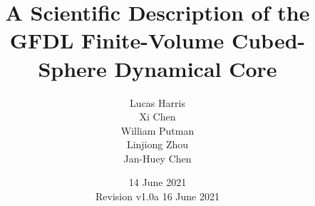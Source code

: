 \documentclass[10pt,letterpaper,margin=1in]{memoir}
\title{A Scientific Description of the GFDL Finite-Volume Cubed-Sphere Dynamical Core}
\author{Lucas Harris\\Xi Chen\\William Putman\\Linjiong Zhou\\Jan-Huey Chen}
\date{14 June 2021\\Revision v1.0a 16 June 2021}
\makeatletter
\newcommand\email[1]{\_email #1\q_nil}
\def\_email#1@#2\q_nil{%
\makeatother
\begin{document}
\maketitle
\thispagestyle{empty}

\eject
\tableofcontents

\chapter*{Disclaimer}

\addcontentsline{toc}{chapter}{Disclaimer}

We have made every effort to ensure that the information in this document is as accurate, complete, and as up-to-date as possible. However, due to the rapid pace of FV3 development the document may not always reflect the current state of FV3 capabilities. Often, the code itself is the best description of the current capabilities and the available options, which due to limited space cannot all be described in full detail here. Contact GFDL FV3 support at \email{oar.gfdl.fv3_dycore_support@noaa.gov} for assistance and more information. 

The most up-to-date documentation, articles, and tutorials can always be found at the GFDL Documentation and References site at \href{https://www.gfdl.noaa.gov/fv3/fv3-documentation-and-references/}{www.gfdl.noaa.gov/fv3/fv3-documentation-and-references/}.

This document is licensed under the Creative Commons Attribution 4.0 International license, which allows reuse and distribution for any purpose but requires that the authors be credited.

  \begin{center}
   \texttt{[image: \{fv3logo.png]}}
  \end{center}

\chapter*{Dedication and Acknowledgements}


Virtually all of the algorithms described in this document are the work of Shian-Jiann Lin, of late retired from NOAA. This document is the interpretation of the FV3 algorithms and design by the authors, although it is heavily influenced by S-J's thinking and he provided reviews of a very early draft. We could say of this document that it contains ``not one word of Lin and not one thought of Harris et al.'', channeling the aphorism applied to the textbooks written by the Soviet physicists Lev Landau and Evgeny Lifshitz.  \textit{We strongly advise that, when citing this document, references to the documents describing specific algorithms also be cited.} This is to ensure S-J receives the proper credit for his work.
\end{document}
